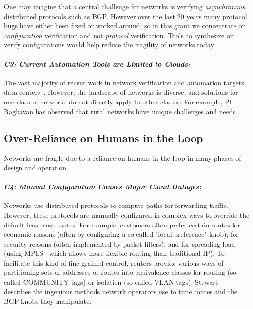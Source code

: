 One may imagine that a central challenge for networks is verifying {\em asynchronous} distributed protocols such as BGP.  However over the last 20 years many protocol bugs have either been fixed or worked around; so in this grant we concentrate on {\em configuration} verification and not {\em protocol} verification.  Tools to synthesize or verify configurations would help reduce the fragility of networks today.

\paragraph*{\em C3: Current Automation Tools are Limited to Clouds:}
%
The vast majority of recent work in network verification and automation targets data centers~\cite{hsa, surgeries, libra, DBLP:conf/popl/FosterKM0T15}. However, the landscape of networks is diverse, and solutions for one class of networks do not directly apply to other classes.   For example, PI Raghavan has observed that rural networks have unique challenges and needs~\cite{barathwisp}. 

\subsection{Over-Reliance on Humans in the Loop}
%
Networks are fragile due to a reliance on humans-in-the-loop in many phases of design and operation.

\paragraph*{\em C4: Manual Configuration Causes Major Cloud Outages:}
Networks use distributed protocols to compute paths for forwarding
traffic.  However, these protocols are manually configured in complex
ways to override the default least-cost routes.  For example,
customers often prefer certain routes for economic reasons (often by
configuring a so-called "local preference" knob); for security reasons
(often implemented by packet filters); and for spreading load (using  MPLS~\cite{MPLSIna} which allows more flexible routing
than traditional IP). To facilitate this kind of fine-grained control,
routers provide various ways of partitioning sets of addresses or
routes into equivalence classes for routing (so-called COMMUNITY tags)
or isolation (so-called VLAN tags). Stewart~\cite{stewart}
describes the ingenious methods network operators use to tune routes
and the BGP knobs they manipulate.

